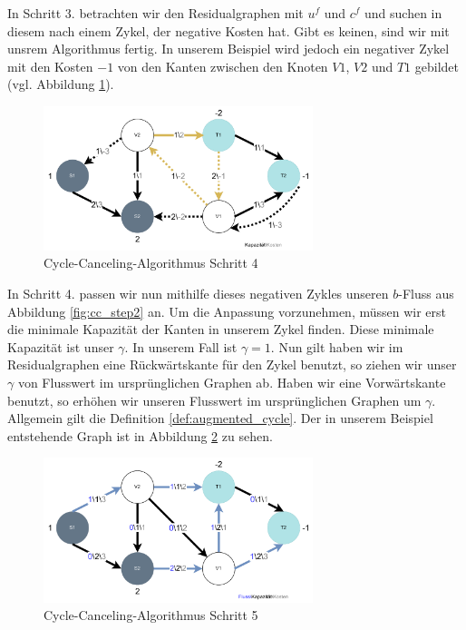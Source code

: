 In Schritt 3. betrachten wir den Residualgraphen mit $u^f$ und $c^f$ und suchen in diesem nach einem Zykel, der negative Kosten hat. Gibt es keinen, sind wir mit unsrem Algorithmus fertig. In unserem Beispiel wird jedoch ein negativer Zykel mit den Kosten $-1$ von den Kanten zwischen den Knoten $V1$, $V2$ und $T1$ gebildet (vgl. Abbildung \ref{fig:cc_step4}).
\begin{figure}[htb]
\centering
\includegraphics[width=0.7\textwidth]{img/leo/graph1-Page-4.drawio.pdf}
\caption{Cycle-Canceling-Algorithmus Schritt 4}
\label{fig:cc_step4}
\end{figure}

In Schritt 4. passen wir nun mithilfe dieses negativen Zykles unseren $b$-Fluss aus Abbildung \ref{fig:cc_step2} an. Um die Anpassung vorzunehmen, müssen wir erst die minimale Kapazität der Kanten in unserem Zykel finden. Diese minimale Kapazität ist unser $\gamma$. In unserem Fall ist $\gamma = 1$. Nun gilt haben wir im Residualgraphen eine Rückwärtskante für den Zykel benutzt, so ziehen wir unser $\gamma$ von Flusswert im ursprünglichen Graphen ab. Haben wir eine Vorwärtskante benutzt, so erhöhen wir unseren Flusswert im ursprünglichen Graphen um $\gamma$. Allgemein gilt die Definition \ref{def:augmented_cycle}. Der in unserem Beispiel entstehende Graph ist in Abbildung \ref{fig:cc_step5} zu sehen.
\begin{figure}[htb]
\centering
\includegraphics[width=0.7\textwidth]{img/leo/graph1-Page-5.drawio.pdf}
\caption{Cycle-Canceling-Algorithmus Schritt 5}
\label{fig:cc_step5}
\end{figure}


